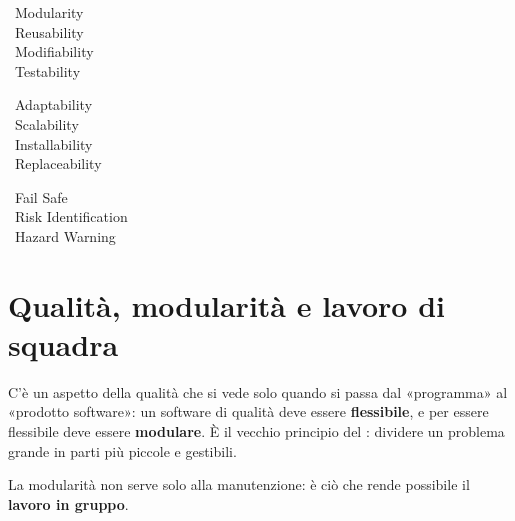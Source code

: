 \begin{tcbraster}[raster columns=3, raster equal height=rows, raster column skip=3mm, raster row skip=3mm]
  \begin{tcolorbox}[colback=q7!5, colframe=q7, title=\textbf{Maintainability}, fontupper=\small]
    \textbullet\ Modularity\\\textbullet\ Reusability\\\textbullet\ Modifiability\\\textbullet\ Testability
  \end{tcolorbox}
  \begin{tcolorbox}[colback=q8!5, colframe=q8, title=\textbf{Flexibility}, fontupper=\small]
    \textbullet\ Adaptability\\\textbullet\ Scalability\\\textbullet\ Installability\\\textbullet\ Replaceability
  \end{tcolorbox}
  \begin{tcolorbox}[colback=q9!5, colframe=q9, title=\textbf{Safety}, fontupper=\small]
    \textbullet\ Fail Safe\\\textbullet\ Risk Identification\\\textbullet\ Hazard Warning
  \end{tcolorbox}
\end{tcbraster}

\section{Qualità, modularità e lavoro di squadra}

C'è un aspetto della qualità che si vede solo quando si passa dal «programma» al «prodotto software»: un software di qualità
deve essere \textbf{flessibile}, e per essere flessibile deve essere \textbf{modulare}. È il vecchio principio del
: dividere un problema grande in parti più piccole e gestibili.

La modularità non serve solo alla manutenzione: è ciò che rende possibile il \textbf{lavoro in gruppo}.

